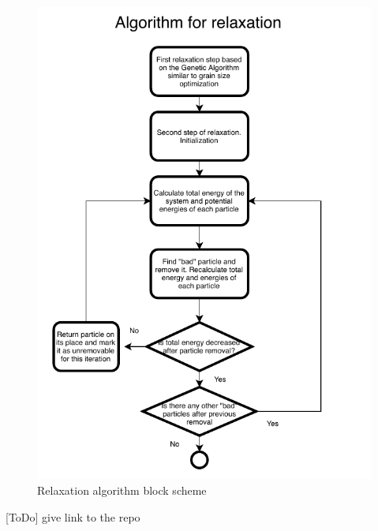 \documentclass[12pt]{report}
\begin{document}
\begin{figure}
    \centering
    \includegraphics[width=5.0in]{RelaxationCommonBlockScheme}
    \caption{Relaxation algorithm block scheme}
    \label{relaxation block}
\end{figure}


[ToDo] give link to the repo
\end{document}
